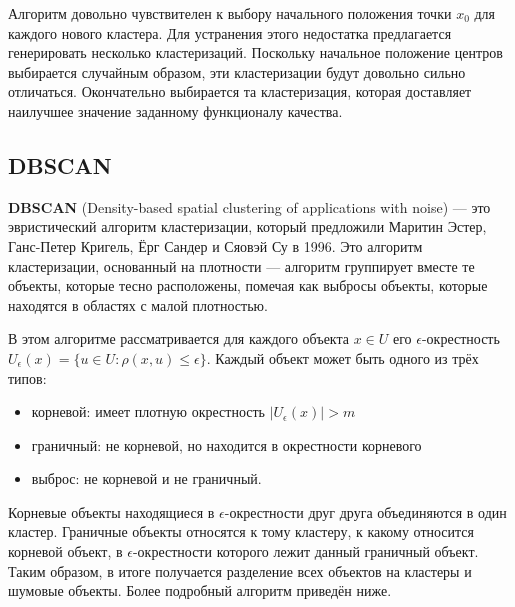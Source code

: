 \documentclass[article, 10pt]{disser}
\begin{document}
Алгоритм довольно чувствителен к выбору начального положения точки $x_0$ для каждого нового кластера. Для устранения этого недостатка предлагается генерировать несколько кластеризаций. Поскольку начальное положение центров выбирается случайным образом, эти кластеризации будут довольно сильно отличаться. Окончательно выбирается та кластеризация, которая доставляет наилучшее значение заданному функционалу качества.

\subsection{DBSCAN}
\textbf{DBSCAN} (Density-based spatial clustering of applications with noise) --- это эвристический алгоритм кластеризации, который предложили Маритин Эстер, Ганс-Петер Кригель, Ёрг Сандер и Сяовэй Су в 1996. Это алгоритм кластеризации, основанный на плотности --- алгоритм группирует вместе те объекты, которые тесно расположены, помечая как выбросы объекты, которые находятся в областях с малой плотностью.

В этом алгоритме рассматривается для каждого объекта $x \in U$ его $\epsilon$-окрестность $U_{\epsilon}(x) = \{u \in U : \rho(x, u) \leq \epsilon\}$. Каждый объект может быть одного из трёх типов:
\begin{itemize}
    \item корневой: имеет плотную окрестность $|U_{\epsilon}(x)| > m$
    \item граничный: не корневой, но находится в окрестности корневого
    \item выброс: не корневой и не граничный.
\end{itemize}
Корневые объекты находящиеся в $\epsilon$-окрестности друг друга объединяются в один кластер. Граничные объекты относятся к тому кластеру, к какому относится корневой объект, в $\epsilon$-окрестности которого лежит данный граничный объект. Таким образом, в итоге получается разделение всех объектов на кластеры и шумовые объекты. Более подробный алгоритм приведён ниже.
\end{document}
